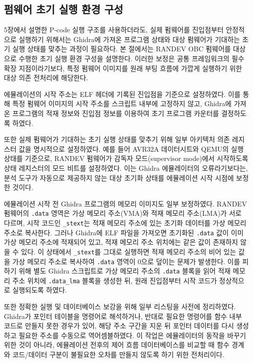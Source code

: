 \documentclass[master,korean,final]{kaist-ucs}
\begin{document}
\subsection{펌웨어 초기 실행 환경 구성}

5장에서 설명한 P-code 실행 구조를 사용하더라도, 실제 펌웨어를 진입점부터 안정적으로 실행하기 위해서는 Ghidra에 가져온 프로그램 상태와 대상 펌웨어가 기대하는 초기 실행 상태를 맞추는 과정이 필요하다. 본 절에서는 RANDEV OBC 펌웨어를 대상으로 수행한 초기 실행 환경 구성을 설명한다. 이러한 보정은 공통 프레임워크의 필수 확장 지점이라기보다, 특정 펌웨어 이미지를 원래 부팅 흐름에 가깝게 실행하기 위한 대상 의존 전처리에 해당한다.

에뮬레이션의 시작 주소는 ELF 헤더에 기록된 진입점을 기준으로 설정하였다. 이를 통해 특정 펌웨어 이미지의 시작 주소를 스크립트 내부에 고정하지 않고, Ghidra에 가져온 프로그램의 적재 정보와 진입점 정보를 이용하여 초기 프로그램 카운터를 결정하도록 하였다.

또한 실제 펌웨어가 기대하는 초기 실행 상태를 맞추기 위해 일부 아키텍처 의존 레지스터 값을 명시적으로 설정하였다. 예를 들어 AVR32A 데이터시트와 QEMU의 실행 상태를 기준으로, RANDEV 펌웨어가 감독자 모드(supervisor mode)에서 시작하도록 상태 레지스터의 모드 비트를 설정하였다. 이는 Ghidra 에뮬레이터의 오류라기보다는, 분석 도구가 자동으로 제공하지 않는 대상 초기화 상태를 에뮬레이션 시작 시점에 보정한 것이다.

에뮬레이션 시작 전 Ghidra 프로그램의 메모리 이미지도 일부 보정하였다. RANDEV 펌웨어의 \texttt{.data} 영역은 가상 메모리 주소(VMA)와 적재 메모리 주소(LMA)가 서로 다르며, 시작 코드인 \texttt{\_stext}는 적재 메모리 주소에 있는 초기화 데이터를 가상 메모리 주소로 복사한다. 그러나 Ghidra에 ELF 파일을 가져오면 초기화된 \texttt{.data} 값이 이미 가상 메모리 주소에 적재되어 있고, 적재 메모리 주소 위치에는 같은 값이 존재하지 않을 수 있다. 이 상태에서 \texttt{\_stext}를 그대로 실행하면 적재 메모리 주소의 비어 있는 값을 가상 메모리 주소로 복사하여 \texttt{.data} 영역이 0으로 덮이는 문제가 발생한다. 이를 피하기 위해 별도 Ghidra 스크립트로 가상 메모리 주소의 \texttt{.data} 블록을 읽어 적재 메모리 주소 위치에 \texttt{.data\_lma} 블록을 생성한 뒤, 원래 진입점부터 시작 코드가 정상적으로 실행되도록 하였다.

또한 정확한 실행 및 데이터베이스 보강을 위해 일부 리스팅을 사전에 정리하였다. Ghidra가 포인터 테이블을 명령어로 해석하거나, 반대로 필요한 명령어를 함수 내부 코드로 만들지 못한 경우가 있어, 해당 주소 구간을 지운 뒤 포인터 데이터를 다시 생성하고 필요한 주소를 수동으로 역어셈블하였다. 이 작업은 에뮬레이터의 동작을 바꾸기 위한 것이 아니라, 에뮬레이션 전후의 제어 흐름 데이터베이스를 비교할 때 함수 경계와 코드/데이터 구분이 불필요한 오차를 만들지 않도록 하기 위한 전처리이다.
\end{document}

